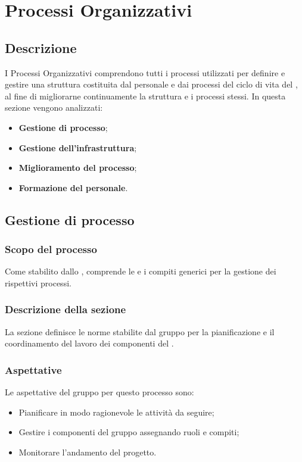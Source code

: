\section{Processi Organizzativi}
\label{PO}
\subsection{Descrizione}\label{PO_Descrizione}
I Processi Organizzativi comprendono tutti i processi utilizzati per definire e gestire una struttura costituita dal personale e dai processi del ciclo di vita del , al fine di migliorarne continuamente la struttura e i processi stessi. 
In questa sezione vengono analizzati:
\begin{itemize}
	\item \textbf{Gestione di processo};
	\item \textbf{Gestione dell'infrastruttura};
	\item \textbf{Miglioramento del processo};
	\item \textbf{Formazione del personale}.
\end{itemize}

\subsection{Gestione di processo}
\subsubsection{Scopo del processo}\label{PO_GestioneProcesso_Scopo}
Come stabilito dallo  , comprende le  e i compiti generici per la gestione dei rispettivi processi.

\subsubsection{Descrizione della sezione}
La sezione definisce le norme stabilite dal gruppo per la pianificazione e il coordinamento del lavoro dei componenti del .

\subsubsection{Aspettative}
Le aspettative del gruppo per questo processo sono:
\begin{itemize}
	\item Pianificare in modo ragionevole le attività da seguire;
	\item Gestire i componenti del gruppo assegnando ruoli e compiti;
	\item Monitorare l'andamento del progetto.
\end{itemize}


